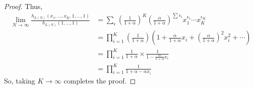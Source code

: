 \documentclass[11pt,leqno,oneside]{amsart}
\numberwithin{thm}{section}
\begin{document}
\begin{proof}
  Thus,
  \begin{align*}
   \lim_{N \to \infty} \frac{h_{L(N)}(x_1, \ldots, x_K, 1, \ldots,
    1)}{h_{L(N)}(1,\ldots,1)} & = \sum_{\epsilon} \left(
                                \frac{1}{1+\alpha} \right)^K \left( 
      \frac{\alpha}{1+\alpha} \right)^{\sum \epsilon_i}
                                x_1^{\epsilon_1} \cdots
                                x_K^{\epsilon_K} \\ 
    & = \prod_{i=1}^K \left( \frac{1}{1+\alpha} \right)\left( 1 +
      \frac{\alpha}{1+\alpha}x_i + \left( \frac{\alpha}{1+\alpha}
    \right)^2 x_i^2 + \cdots \right) \\
    & = \prod_{i=1}^K
    \frac{1}{1+\alpha} 
    \times \frac{1}{1-\frac{\alpha}{1+\alpha}x_i} \\
    & = \prod_{i=1}^K \frac{1}{1+\alpha-\alpha x_i}
  \end{align*}
  So, taking \(K \to \infty\) completes the proof.
\end{proof}
\begin{bibdiv}
  \begin{biblist}
  \end{biblist}
\end{bibdiv}
\end{document}
